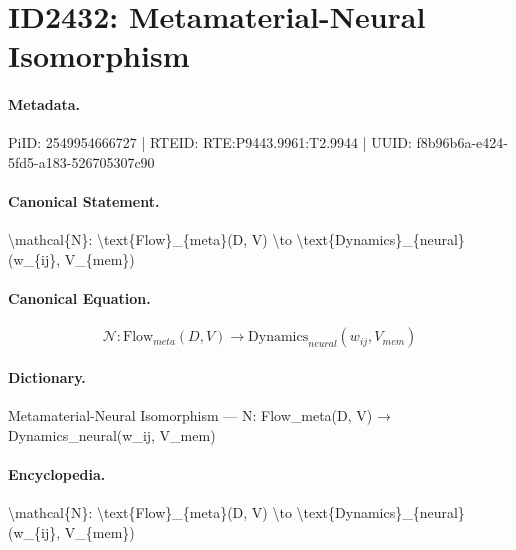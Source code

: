 \section*{ID2432: Metamaterial-Neural Isomorphism}
\paragraph{Metadata.}
PiID: 2549954666727 | RTEID: RTE:P9443.9961:T2.9944 | UUID: f8b96b6a-e424-5fd5-a183-526705307c90

\paragraph{Canonical Statement.}
\textbackslash{}mathcal\{N\}: \textbackslash{}text\{Flow\}\_\{meta\}(D, V) \textbackslash{}to \textbackslash{}text\{Dynamics\}\_\{neural\}(w\_\{ij\}, V\_\{mem\})

\paragraph{Canonical Equation.}
\[
\mathcal{N}: \text{Flow}_{meta}(D, V) \to \text{Dynamics}_{neural}(w_{ij}, V_{mem})
\]

\paragraph{Dictionary.}
Metamaterial-Neural Isomorphism — N: Flow\_meta(D, V) → Dynamics\_neural(w\_ij, V\_mem)

\paragraph{Encyclopedia.}
\textbackslash{}mathcal\{N\}: \textbackslash{}text\{Flow\}\_\{meta\}(D, V) \textbackslash{}to \textbackslash{}text\{Dynamics\}\_\{neural\}(w\_\{ij\}, V\_\{mem\})

